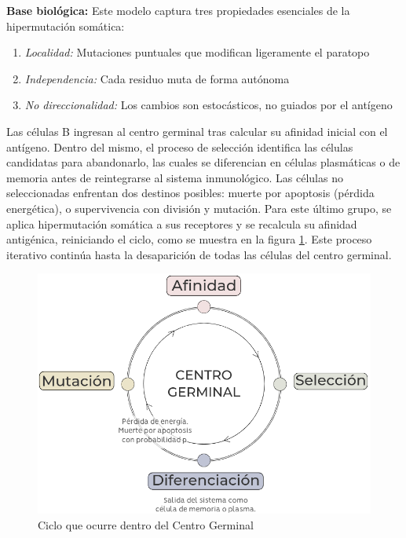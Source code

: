 \noindent \textbf{Base biológica:} Este modelo captura tres propiedades esenciales de la hipermutación somática:
\begin{enumerate}
    \item \textit{Localidad:} Mutaciones puntuales que modifican ligeramente el paratopo
    
    \item \textit{Independencia:} Cada residuo muta de forma autónoma
    
    \item \textit{No direccionalidad:} Los cambios son estocásticos, no guiados por el antígeno
\end{enumerate}

 


Las células B ingresan al centro germinal tras calcular su afinidad inicial con el antígeno. Dentro del mismo, el proceso de selección identifica las células candidatas para abandonarlo, las cuales se diferencian en células plasmáticas o de memoria antes de reintegrarse al sistema inmunológico. Las células no seleccionadas enfrentan dos destinos posibles: muerte por apoptosis (pérdida energética), o supervivencia con división y mutación. Para este último grupo, se aplica hipermutación somática a sus receptores y se recalcula su afinidad antigénica, reiniciando el ciclo, como se muestra en la figura \ref{fig:cg}. Este proceso iterativo continúa hasta la desaparición de todas las células del centro germinal. 

\begin{figure}[H] %
    \centering
    \includegraphics[width=1\textwidth]{Graphics/gc.png}
    \caption{Ciclo que ocurre dentro del Centro Germinal}
    \label{fig:cg}
\end{figure}

